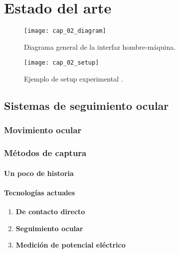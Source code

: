 \documentclass[../main.tex]{subfiles}
\begin{document}
		
\chapter{Estado del arte}
\label{cha:02_estado_del_arte}

	\begin{figure}[H]
		\centering
		\texttt{[image: cap\_02\_diagram]}
		\caption{Diagrama general de la interfaz hombre-máquina.}
		\label{fig:02_diagrama_interfaz}
	\end{figure}

	\begin{figure}[H]
		\centering
		\texttt{[image: cap\_02\_setup]}
		\caption{Ejemplo de \gls{setup} experimental \cite{website:baseInfo}.}
		\label{fig:02_ejemplo_setup}
	\end{figure}

	\section{Sistemas de seguimiento ocular}
	\label{sec:02_sistemas_de_seguimiento_ocular}
		\subsection{Movimiento ocular}
		\label{sub:02_movimiento_ocular}


		\subsection{Métodos de captura}
		\label{sub:02_metodos_de_captura}
			\subsubsection{Un poco de historia}
			\label{ssub:02_un_poco_de_historia_tracker}

			\subsubsection{Tecnologías actuales}
			\label{ssub:02_tecnologias_actuales}
				\begin{enumerate}
					\item \textbf{De contacto directo}

					\item \textbf{Seguimiento ocular}

					\item \textbf{Medición de potencial eléctrico}

				\end{enumerate}
\end{document}
